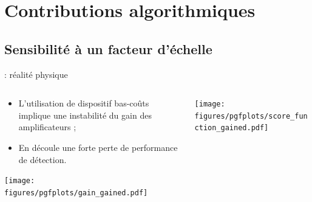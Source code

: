 \documentclass[../main.tex]{subfiles}
\begin{document}
\section{Contributions algorithmiques}

\subsection{Sensibilité à un facteur d'échelle}

\begin{frame}{\subsecname : réalité physique}
  \begin{columns}
    \begin{column}{.5\linewidth}
      \centering
      \begin{itemize}
        \item L'utilisation de dispositif bas-coûts implique une instabilité du gain des amplificateurs ;
        \item En découle une forte perte de performance de détection.
      \end{itemize} \vspace*{1 em}

      \texttt{[image: figures/pgfplots/gain\_gained.pdf]}
    \end{column}
    \begin{column}{.5\linewidth}
      \texttt{[image: figures/pgfplots/score\_function\_gained.pdf]}
    \end{column}
  \end{columns}
\end{frame}
\end{document}
